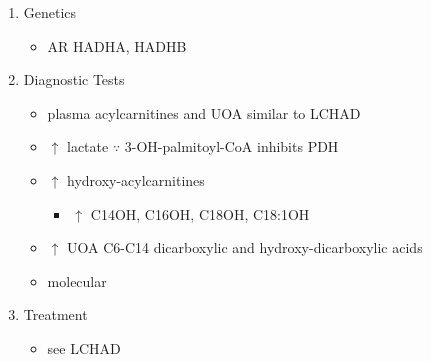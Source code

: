 \documentclass[12pt]{scrartcl}
\begin{document}
\begin{enumerate}
\item Genetics
\label{sec:org0fef6e1}
\begin{itemize}
\item AR HADHA, HADHB
\end{itemize}

\item Diagnostic Tests
\label{sec:org33fb224}
\begin{itemize}
\item plasma acylcarnitines and UOA similar to LCHAD
\item \(\uparrow\) lactate \(\because\) 3-OH-palmitoyl-CoA inhibits PDH
\item \(\uparrow\) hydroxy-acylcarnitines
\begin{itemize}
\item \(\uparrow\) C14OH, C16OH, C18OH, C18:1OH
\end{itemize}
\item \(\uparrow\) UOA C6-C14 dicarboxylic and hydroxy-dicarboxylic acids
\item molecular
\end{itemize}

\item Treatment
\label{sec:org6921afb}
\begin{itemize}
\item see LCHAD
\end{itemize}
\end{enumerate}
\end{document}
